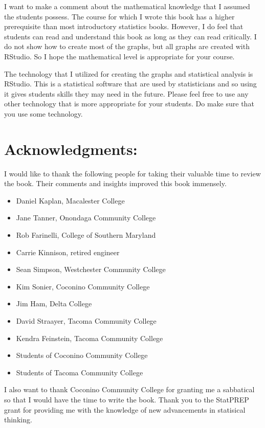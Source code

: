 \documentclass[
]{book}
\providecommand{\tightlist}{%
  \setlength{\itemsep}{0pt}\setlength{\parskip}{0pt}}
\begin{document}
I want to make a comment about the mathematical knowledge that I assumed the students possess. The course for which I wrote this book has a higher prerequisite than most introductory statistics books. However, I do feel that students can read and understand this book as long as they can read critically. I do not show how to create most of the graphs, but all graphs are created with RStudio. So I hope the mathematical level is appropriate for your course.

The technology that I utilized for creating the graphs and statistical analysis is RStudio. This is a statistical software that are used by statisticians and so using it gives students skills they may need in the future. Please feel free to use any other technology that is more appropriate for your students. Do make sure that you use some technology.

\hypertarget{acknowledgments}{%
\section{Acknowledgments:}\label{acknowledgments}}

I would like to thank the following people for taking their valuable time to review the book. Their comments and insights improved this book immensely.

\begin{itemize}
\tightlist
\item
  Daniel Kaplan, Macalester College
\item
  Jane Tanner, Onondaga Community College
\item
  Rob Farinelli, College of Southern Maryland
\item
  Carrie Kinnison, retired engineer
\item
  Sean Simpson, Westchester Community College
\item
  Kim Sonier, Coconino Community College
\item
  Jim Ham, Delta College
\item
  David Straayer, Tacoma Community College
\item
  Kendra Feinstein, Tacoma Community College
\item
  Students of Coconino Community College
\item
  Students of Tacoma Community College
\end{itemize}

I also want to thank Coconino Community College for granting me a sabbatical so that I would have the time to write the book. Thank you to the StatPREP grant for providing me with the knowledge of new advancements in statisical thinking.
\end{document}
